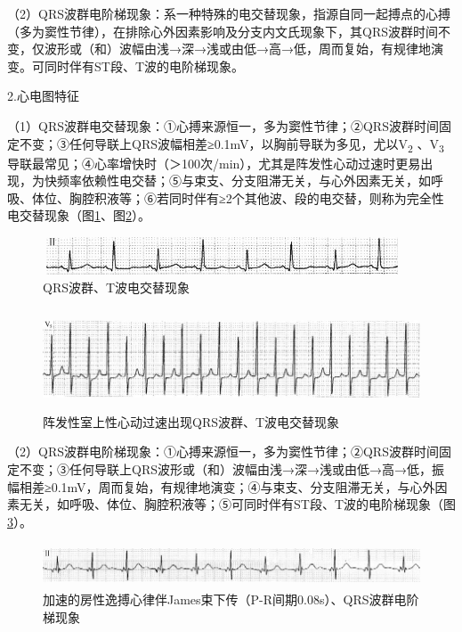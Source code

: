 （2）QRS波群电阶梯现象：系一种特殊的电交替现象，指源自同一起搏点的心搏（多为窦性节律），在排除心外因素影响及分支内文氏现象下，其QRS波群时间不变，仅波形或（和）波幅由浅→深→浅或由低→高→低，周而复始，有规律地演变。可同时伴有ST段、T波的电阶梯现象。

2.心电图特征

（1）QRS波群电交替现象：①心搏来源恒一，多为窦性节律；②QRS波群时间固定不变；③任何导联上QRS波幅相差≥0.1mV，以胸前导联为多见，尤以V\textsubscript{2}
、V\textsubscript{3}
导联最常见；④心率增快时（＞100次/min），尤其是阵发性心动过速时更易出现，为快频率依赖性电交替；⑤与束支、分支阻滞无关，与心外因素无关，如呼吸、体位、胸腔积液等；⑥若同时伴有≥2个其他波、段的电交替，则称为完全性电交替现象（图\ref{fig3-7}、图\ref{fig3-8}）。

\begin{figure}[!htbp]
 \centering
 \includegraphics[width=4.19792in,height=0.4375in]{./images/Image00056.jpg}
 \captionsetup{justification=centering}
 \caption{QRS波群、T波电交替现象}
 \label{fig3-7}
  \end{figure} 

\begin{figure}[!htbp]
 \centering
 \includegraphics[width=5.78125in,height=1.17708in]{./images/Image00057.jpg}
 \captionsetup{justification=centering}
 \caption{阵发性室上性心动过速出现QRS波群、T波电交替现象}
 \label{fig3-8}
  \end{figure} 

（2）QRS波群电阶梯现象：①心搏来源恒一，多为窦性节律；②QRS波群时间固定不变；③任何导联上QRS波形或（和）波幅由浅→深→浅或由低→高→低，振幅相差≥0.1mV，周而复始，有规律地演变；④与束支、分支阻滞无关，与心外因素无关，如呼吸、体位、胸腔积液等；⑤可同时伴有ST段、T波的电阶梯现象（图\ref{fig3-9}）。

\begin{figure}[!htbp]
 \centering
 \includegraphics[width=5.78125in,height=0.51042in]{./images/Image00058.jpg}
 \captionsetup{justification=centering}
 \caption{加速的房性逸搏心律伴James束下传（P-R间期0.08s）、QRS波群电阶梯现象}
 \label{fig3-9}
  \end{figure} 

